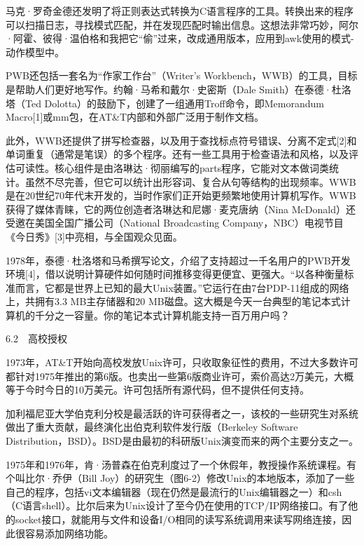 \documentclass[a4paper,12pt,UTF8,twoside]{ctexbook}
\begin{document}
{{马克·罗奇金德还发明了将正则表达式转换为C语言程序的工具。转换出来的程序可以扫描日志，寻找模式匹配，并在发现匹配时输出信息。这想法非常巧妙，阿尔·阿霍、彼得·温伯格和我把它“偷”过来，改成通用版本，应用到awk使用的模式-动作模型中。

PWB还包括一套名为“作家工作台”（Writer’s Workbench，WWB）的工具，目标是帮助人们更好地写作。约翰·马希和戴尔·史密斯（Dale Smith）在泰德·杜洛塔（Ted Dolotta）的鼓励下，创建了一组通用Troff命令，即Memorandum Macro[1]或mm包，在AT\&T内部和外部广泛用于制作文档。

此外，WWB还提供了拼写检查器，以及用于查找标点符号错误、分离不定式[2]和单词重复（通常是笔误）的多个程序。还有一些工具用于检查语法和风格，以及评估可读性。核心组件是由洛琳达·彻丽编写的parts程序，它能对文本做词类统计。虽然不尽完善，但它可以统计出形容词、复合从句等结构的出现频率。WWB是在20世纪70年代末开发的，当时作家们正开始更频繁地使用计算机写作。WWB获得了媒体青睐，它的两位创造者洛琳达和尼娜·麦克唐纳（Nina McDonald）还受邀在美国全国广播公司（National Broadcasting Company，NBC）电视节目《今日秀》[3]中亮相，与全国观众见面。

1978年，泰德·杜洛塔和马希撰写论文，介绍了支持超过一千名用户的PWB开发环境[4]，借以说明计算硬件如何随时间推移变得更便宜、更强大。“以各种衡量标准而言，它都是世界上已知的最大Unix装置。”它运行在由7台PDP-11组成的网络上，共拥有3.3 MB主存储器和20 MB磁盘。这大概是今天一台典型的笔记本式计算机的千分之一容量。你的笔记本式计算机能支持一百万用户吗？





6.2　高校授权


1973年，AT\&T开始向高校发放Unix许可，只收取象征性的费用，不过大多数许可都针对1975年推出的第6版。也卖出一些第6版商业许可，索价高达2万美元，大概等于今时今日的10万美元。许可包括所有源代码，但不提供任何支持。

加利福尼亚大学伯克利分校是最活跃的许可获得者之一，该校的一些研究生对系统做出了重大贡献，最终演化出伯克利软件发行版（Berkeley Software Distribution，BSD）。BSD是由最初的科研版Unix演变而来的两个主要分支之一。

1975年和1976年，肯·汤普森在伯克利度过了一个休假年，教授操作系统课程。有个叫比尔·乔伊（Bill Joy）的研究生（图6-2）修改Unix的本地版本，添加了一些自己的程序，包括vi文本编辑器（现在仍然是最流行的Unix编辑器之一）和csh（C语言shell）。比尔后来为Unix设计了至今仍在使用的TCP/IP网络接口。有了他的socket接口，就能用与文件和设备I/O相同的读写系统调用来读写网络连接，因此很容易添加网络功能。



}}
\end{document}
